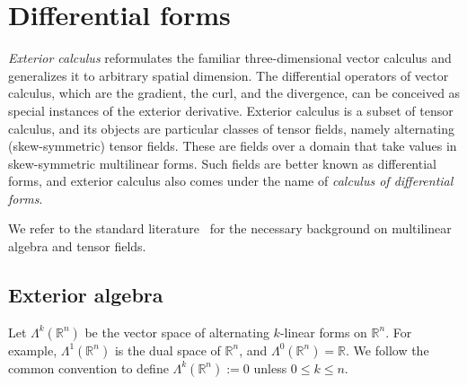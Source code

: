 \documentclass[10pt,a4paper]{amsart}
\theoremstyle{definition}
\theoremstyle{remark}
\numberwithin{equation}{section}
\newcommand{\bbR}{{\mathbb R}}
\newcommand{\Alt}[1]{\Lambda^{#1}}
\begin{document}
\section{Differential forms}\label{section:differential-forms}

\emph{Exterior calculus} reformulates the familiar three-dimensional vector calculus and generalizes it to arbitrary spatial dimension. 
The differential operators of vector calculus, which are the gradient, the curl, and the divergence, can be conceived as special instances of the exterior derivative. 
Exterior calculus is a subset of tensor calculus, and its objects are particular classes of tensor fields, namely alternating (skew-symmetric) tensor fields. 
These are fields over a domain that take values in skew-symmetric multilinear forms. 
Such fields are better known as differential forms, and exterior calculus also comes under the name of \emph{calculus of differential forms}.

We refer to the standard literature~\cite{cartan1967formes,amann2009analysisiii,agricola2010vektoranalysis,lee2012smooth,edwards2014advanced} for the necessary background on multilinear algebra and tensor fields.

\subsection{Exterior algebra}

Let $\Alt{k}(\bbR^{n})$ be the vector space of alternating $k$-linear forms on $\bbR^{n}$. 
For example, $\Alt{1}(\bbR^{n})$ is the dual space of $\bbR^{n}$, and $\Alt{0}(\bbR^{n}) = \bbR$. 
We follow the common convention to define $\Alt{k}(\bbR^{n}) := 0$ unless $0 \leq k \leq n$.
\end{document}
